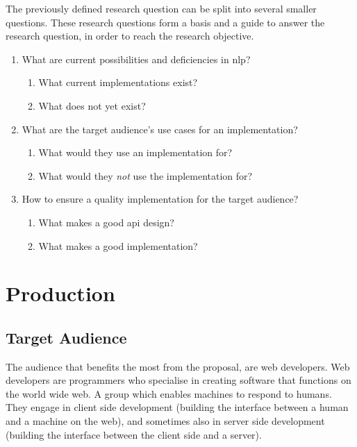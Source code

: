 The previously defined research question can be split into several smaller
  questions.
These research questions form a basis and a guide to answer the research
  question, in order to reach the research objective.

\begin{enumerate}
\item
  What are current possibilities and deficiencies in \gls{nlp}?
  \begin{enumerate}
    \item What current implementations exist?
    \item What does not yet exist?
  \end{enumerate}
\item
  What are the target audience's use cases for an implementation?
  \begin{enumerate}
    \item What would they use an implementation for?
    \item What would they \emph{not} use the implementation for?
  \end{enumerate}
\item
  How to ensure a quality implementation for the target audience?
  \begin{enumerate}
    \item What makes a good \gls{api} design?
    \item What makes a good implementation?
  \end{enumerate}
\end{enumerate}

\chapter{Production}\label{production}

\section{Target Audience}\label{target-audience}

The audience that benefits the most from the proposal, are web developers.
Web developers are programmers who specialise in creating software that
  functions on the world wide web.
A group which enables machines to respond to humans.
They engage in client side development (building the interface between
  a human and a machine on the web), and sometimes also in server side
  development (building the interface between the client side and a
  server).

